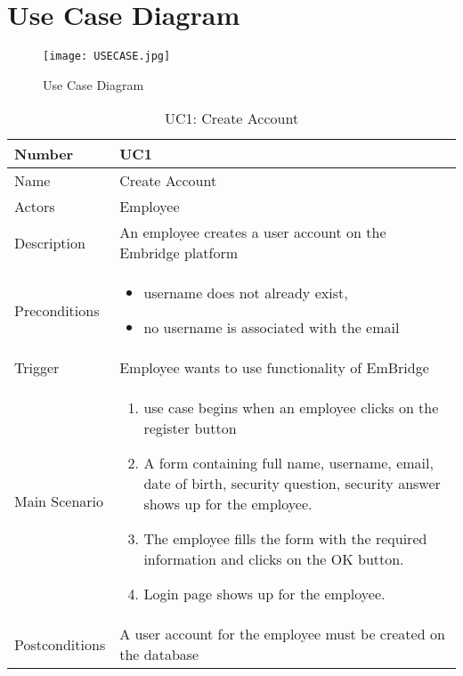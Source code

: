 \documentclass[12pt,a4paper]{article}
\begin{document}
\section{Use Case Diagram}
\begin{figure}[h!]
\centering
\texttt{[image: USECASE.jpg]}
\caption{Use Case Diagram}\citep{bworld}\citep{ref2}
\label{fig:Use Case Diagram}
\end{figure}


\begin{table}[h]
\centering
\caption{UC1: Create Account}
\label{tab:uc1}
\begin{tabularx}{\textwidth}{@{}lX@{}}
\toprule
Number & UC1 \\ \midrule
Name & Create Account \\
Actors & Employee\\
Description & An employee creates a user account on the Embridge platform \\
Preconditions & 
\begin{itemize}
 \item username does not already exist,
\item no username is associated with the email
\end{itemize} \\
Trigger &  Employee wants to use functionality of EmBridge\\
Main Scenario & 
\begin{enumerate}
\item use case begins when an employee clicks on the register button
\item A form containing full name, username, email, date of birth, security question, security answer shows up for the employee.
 \item The employee fills the form with the required information and clicks on the OK button.
\item Login page shows up for the employee.
 \end{enumerate} \\
Postconditions & A user account for the employee must be created on the database \\
\bottomrule
\end{tabularx}
\end{table}
\end{document}
